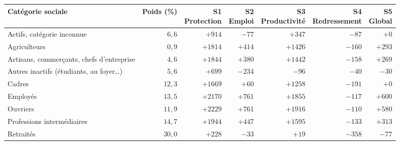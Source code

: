 \begin{tabular}{p{5cm}rrrrrr}\toprule Catégorie sociale & Poids (\%) & \makecell{S1\\Protection} & \makecell{S2\\Emploi} & \makecell{S3\\Productivité} & \makecell{S4\\Redressement} & \makecell{S5\\Global}\\ \midrule
Actifs, catégorie inconnue & $6{,}6$ & $+914$ & $-77$ & $+347$ & $-87$ & $+0$\\
Agriculteurs & $0{,}9$ & $+1814$ & $+414$ & $+1426$ & $-160$ & $+293$\\
Artisans, commerçants, chefs d'entreprise & $4{,}6$ & $+1844$ & $+380$ & $+1442$ & $-158$ & $+269$\\
Autres inactifs (étudiants, au foyer…) & $5{,}6$ & $+699$ & $-234$ & $-96$ & $-40$ & $-30$\\
Cadres & $12{,}3$ & $+1669$ & $+60$ & $+1258$ & $-191$ & $+0$\\
Employés & $13{,}5$ & $+2170$ & $+761$ & $+1855$ & $-117$ & $+600$\\
Ouvriers & $11{,}9$ & $+2229$ & $+761$ & $+1916$ & $-110$ & $+580$\\
Professions intermédiaires & $14{,}7$ & $+1944$ & $+447$ & $+1595$ & $-133$ & $+313$\\
Retraités & $30{,}0$ & $+228$ & $-33$ & $+19$ & $-358$ & $-77$\\\bottomrule\end{tabular}